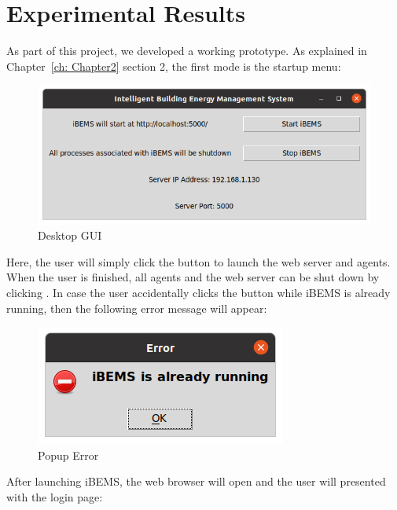 \chapter{Experimental Results}
\label{ch: Chapter4}

As part of this project, we developed a working prototype. As explained in Chapter~\ref{ch: Chapter2} section 2, the first mode is the startup menu:

\begin{figure}[H]
    \centering
    \includegraphics[scale=0.5]{figs/BEMS_GUI_Linux.png}
    \caption{Desktop GUI}
    \label{fig:desktopgui}
\end{figure}

\noindent
Here, the user will simply click the  button to launch the web
server and agents. When the user is finished, all agents and the web server can
be shut down by clicking . In case the user accidentally clicks the
 button while iBEMS is already running, then the following error
message will appear:

\begin{figure}[H]
    \centering
    \includegraphics[scale=0.5]{figs/BEMS_GUI_Linux_Warning.png}
    \caption{Popup Error}
    \label{fig:popuperror}
\end{figure}

\noindent
After launching iBEMS, the web browser will open and the user will presented with the login page:

